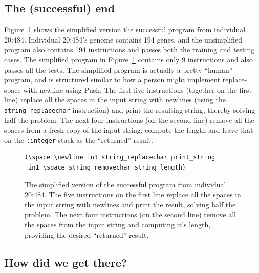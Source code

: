 \subsection{The (successful) end}

Figure~\ref{prog:simplified20:484} 
shows the simplified version the successful program from 
individual 20:484. Individual 20:484's genome contains 194 genes, and the unsimplified 
program also contains 194 instructions and passes both
the training and testing cases. The simplified program in 
Figure~\ref{prog:simplified20:484} contains only 9 instructions and
also passes all the tests. 
The simplified program is actually a pretty ``human'' program, and is structured similar to 
how a person might implement replace-space-with-newline using Push. The first five 
instructions (together on the first line) replace all the spaces in the input string 
with newlines (using the \texttt{string\_replacechar} instruction) and print the 
resulting string, thereby solving half the problem. 
The next four instructions (on the second line) remove all the spaces from
a fresh copy of the input string, compute the length and leave that on the
\texttt{:integer} stack as the ``returned'' result.

\begin{figure}[tb]
\begin{verbatim}
(\space \newline in1 string_replacechar print_string
 in1 \space string_removechar string_length)
\end{verbatim}
\caption{The simplified version of the successful program from individual 20:484. The
	five instructions on the first line replace all the spaces in the input string with newlines
	and print the result, solving half the problem. The next four instructions (on the second
	line) remove all the spaces from the input string and computing it's length, providing
	the desired ``returned'' result.}
\label{prog:simplified20:484}
\end{figure}

\subsection{How did we get there?}

